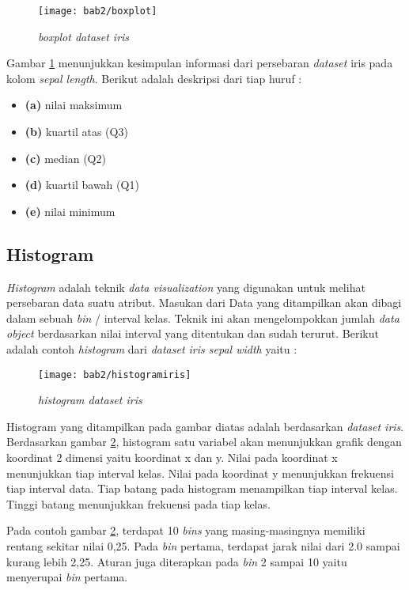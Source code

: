 \begin{figure}[h!]
	\centering  
	\texttt{[image: bab2/boxplot]}   
	\caption{\textit{ boxplot dataset iris}}
	\label{fig:boxplot} 
\end{figure} 
 Gambar \ref{fig:boxplot} menunjukkan kesimpulan informasi dari persebaran \textit{dataset} iris pada kolom \textit{sepal length}. Berikut adalah deskripsi dari tiap huruf : 
	 	
	 	
	 	\begin{itemize}
	 	\item \textbf{(a)} nilai maksimum 
	 	\item \textbf{(b)} kuartil atas (Q3) 
	 	\item \textbf{(c)} median (Q2) 
	 	\item \textbf{(d)} kuartil bawah (Q1)
	 	\item \textbf{(e)} nilai minimum 
	 	\end{itemize}
\pagebreak 	

\subsection{\textbf{Histogram}} 
 \textit{Histogram} adalah teknik \textit{data visualization} yang digunakan untuk melihat persebaran data suatu atribut. Masukan dari  Data yang ditampilkan akan dibagi dalam sebuah \textit{bin} / interval kelas. Teknik ini akan mengelompokkan jumlah \textit{data object} berdasarkan nilai interval yang ditentukan dan sudah terurut. Berikut adalah contoh \textit{histogram} dari \textit{dataset iris sepal width} yaitu :
	 	
	 	   	
\begin{figure}[h!]
	\centering  
	\texttt{[image: bab2/histogramiris]}   
	\caption{\textit{ histogram dataset iris}}
	\label{fig:histogram} 
\end{figure} 
	
	
 Histogram yang ditampilkan pada gambar diatas adalah berdasarkan \textit{dataset iris}. Berdasarkan gambar \ref{fig:histogram}, histogram satu variabel akan menunjukkan grafik dengan koordinat 2 dimensi yaitu koordinat x dan y. Nilai pada koordinat x menunjukkan tiap interval kelas. Nilai pada koordinat y menunjukkan frekuensi tiap interval data. Tiap batang pada histogram menampilkan tiap interval kelas. Tinggi batang menunjukkan frekuensi pada tiap kelas.
		
 Pada contoh gambar \ref{fig:histogram}, terdapat 10 \textit{bins} yang masing-masingnya memiliki rentang sekitar nilai 0,25. Pada \textit{bin} pertama, terdapat jarak nilai dari 2.0 sampai kurang lebih 2,25. Aturan juga diterapkan pada \textit{bin} 2 sampai 10 yaitu menyerupai  \textit{bin} pertama. \\ 
 
